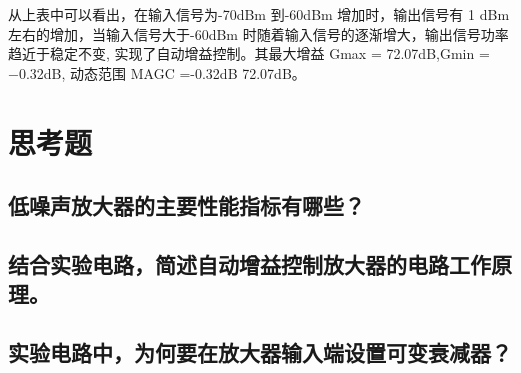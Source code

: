 \documentclass{../source/Experiment}
\begin{document}
从上表中可以看出，在输入信号为-70dBm 到-60dBm 增加时，输出信号有 1 dBm 左右的增加，当输入信号大于-60dBm 时随着输入信号的逐渐增大，输出信号功率趋近于稳定不变, 实现了自动增益控制。其最大增益 Gmax = 72.07dB,Gmin = −0.32dB, 动态范围 MAGC =-0.32dB 72.07dB。

\section{思考题}
\subsection{低噪声放大器的主要性能指标有哪些？}

\subsection{结合实验电路，简述自动增益控制放大器的电路工作原理。
}

\subsection{实验电路中，为何要在放大器输入端设置可变衰减器？}
\end{document}
